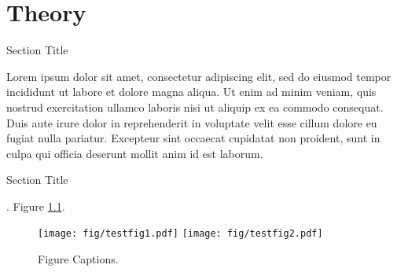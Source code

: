 \chapter{Theory}
\begin{section}{Section Title}

Lorem ipsum dolor sit amet, consectetur adipiscing elit, sed do eiusmod tempor incididunt ut labore et dolore magna aliqua. Ut enim ad minim veniam, quis nostrud exercitation ullamco laboris nisi ut aliquip ex ea commodo consequat. Duis aute irure dolor in reprehenderit in voluptate velit esse cillum dolore eu fugiat nulla pariatur. Excepteur sint occaecat cupidatat non proident, sunt in culpa qui officia deserunt mollit anim id est laborum.

\end{section}

\begin{section}{Section Title}

\cite{Maldacena:1997re,joesbook}. Figure \ref{fig:label}.

\begin{figure}[t]
\centerline{\texttt{[image: fig/testfig1.pdf]}
\hspace{1cm}\texttt{[image: fig/testfig2.pdf]}}
\caption{Figure Captions.}
\label{fig:label}
\end{figure}

\end{section}
